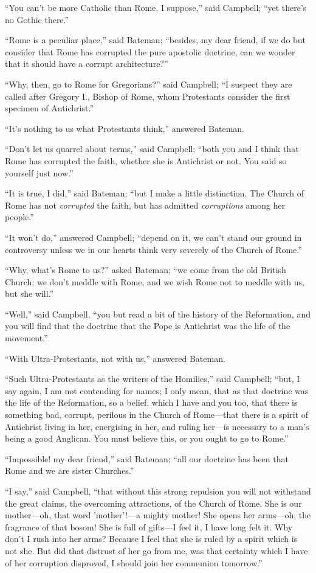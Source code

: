``You can't be more Catholic than Rome, I suppose,'' said
Campbell; ``yet there's no Gothic there.''

``Rome is a peculiar place,'' said Bateman; ``besides,
my dear friend, if we do but consider that Rome has corrupted the pure
apostolic doctrine, can we wonder that it should have a corrupt
architecture?''

``Why, then, go to Rome for Gregorians?'' said Campbell;
``I suspect they are called after Gregory I., Bishop of Rome, whom
Protestants consider the first specimen of Antichrist.''

``It's nothing to us what Protestants think,'' answered
Bateman.

``Don't let us quarrel about terms,'' said Campbell;
``both you and I think that Rome has corrupted the faith, whether
she is Antichrist or not. You said so yourself just now.''

``It is true, I did,'' said Bateman; ``but I make a
little distinction. The Church of Rome has not \emph{corrupted} the
faith, but has admitted \emph{corruptions} among her people.''

``It won't do,'' answered Campbell; ``depend on it,
we can't stand our ground in controversy unless we in our hearts
think very severely of the Church of Rome.''

``Why, what's Rome to us?'' asked Bateman; ``we come
from the old British Church; we don't meddle with Rome, and we wish
Rome not to meddle with us, but she will.''

``Well,'' said Campbell, ``you but read a bit of the
history of the Reformation, and you will find that the doctrine that
the Pope is Antichrist was the life of the movement.''

``With Ultra-Protestants, not with us,'' answered Bateman.

``Such Ultra-Protestants as the writers of the Homilies,''
said Campbell; ``but, I say again, I am not contending for names;
I only mean, that as that doctrine was the life of the Reformation, so
a belief, which I have and you too, that there is something bad,
corrupt, perilous in the Church of Rome—that there is a spirit of
Antichrist living in her, energising in her, and ruling her—is
necessary to a man's being a good Anglican. You must believe this, or
you ought to go to Rome.''

``Impossible! my dear friend,'' said Bateman; ``all our
doctrine has been that Rome and we are sister Churches.''

``I say,'' said Campbell, ``that without this strong
repulsion you will not withstand the great claims, the overcoming
attractions, of the Church of Rome. She is our mother—oh, that word
'mother'!—a mighty mother! She opens her arms—oh, the fragrance of
that bosom! She is full of gifts—I feel it, I have long felt
it. Why don't I rush into her arms? Because I feel that she is ruled
by a spirit which is not she. But did that distrust of her go from me,
was that certainty which I have of her corruption disproved, I should
join her communion tomorrow.''

